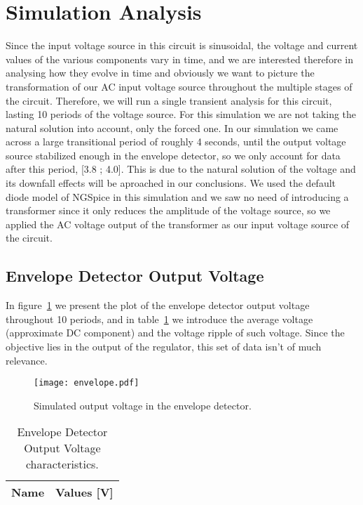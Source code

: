 \newpage
\section{Simulation Analysis}
\label{sec:simulation}
Since the input voltage source in this circuit is sinusoidal, the voltage and current values of the various components vary in time, and we are interested therefore in analysing how they evolve in time and obviously we want to picture the transformation of our AC input voltage source throughout the multiple stages of the circuit. Therefore, we will run a single transient analysis for this circuit, lasting 10 periods of the voltage source. For this simulation we are not taking the natural solution into account, only the forced one. In our simulation we came across a large transitional period of roughly 4 seconds, until the output voltage source stabilized enough in the envelope detector, so we only account for data after this period, [3.8 ; 4.0]. This is due to the natural solution of the voltage and its downfall effects will be aproached in our conclusions. We used the default diode model of NGSpice in this simulation and we saw no need of introducing a transformer since it only reduces the amplitude of the voltage source, so we applied the AC voltage output of the transformer as our input voltage source of the circuit.
\subsection{Envelope Detector Output Voltage}
In figure~\ref{fig:envelope} we present the plot of the envelope detector output voltage throughout 10 periods, and in table~\ref{tab:envelope} we introduce the average voltage (approximate DC component) and the voltage ripple of such voltage. Since the objective lies in the output of the regulator, this set of data isn't of much relevance.

\begin{figure}[!h] \centering
\texttt{[image: envelope.pdf]}
\caption{Simulated output voltage in the envelope detector.}
\label{fig:envelope}
\end{figure}

\begin{table}[h]
  \centering
  \begin{tabular}{|l|r|}
    \hline    
    {\bf Name} & {\bf Values [V]} \\ \hline
     
  \end{tabular}
  \caption{Envelope Detector Output Voltage characteristics.}
  \label{tab:envelope}
\end{table}

